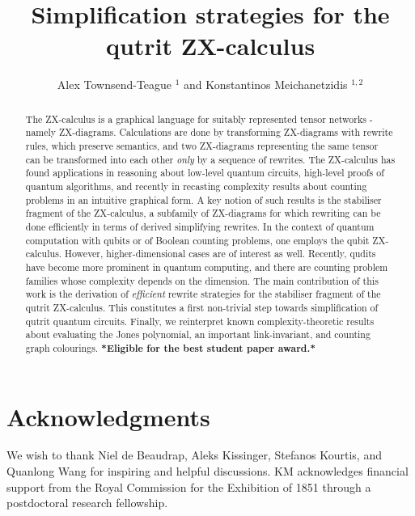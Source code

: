 \documentclass[runningheads]{llncs}
\title{Simplification strategies for the qutrit ZX-calculus}
\author{Alex Townsend-Teague $^{1}$ and Konstantinos Meichanetzidis $^{1,2}$
	\institute{$^1$ University of Oxford \\ $^2$ Cambridge Quantum Computing Ltd.}
}
\begin{document}
\maketitle
\begin{abstract}
	The ZX-calculus is a graphical language for suitably represented tensor networks - namely ZX-diagrams.
	Calculations are done by transforming ZX-diagrams with rewrite rules, which preserve semantics, and two ZX-diagrams representing the same tensor can be transformed into each other \emph{only} by a sequence of rewrites.
	The ZX-calculus has found applications in reasoning about low-level quantum circuits, high-level proofs of quantum algorithms, and recently in recasting complexity results about counting problems in an intuitive graphical form.
	A key notion of such results is the stabiliser fragment of the ZX-calculus, a subfamily of ZX-diagrams for which rewriting can be done efficiently in terms of derived simplifying rewrites.
	In the context of quantum computation with qubits or of Boolean counting problems, one employs the qubit ZX-calculus.
	However, higher-dimensional cases are of interest as well. Recently, qudits have become more prominent in quantum computing, and there are counting problem families whose complexity depends on the dimension.
	The main contribution of this work is the derivation of
	\emph{efficient} rewrite strategies for the stabiliser fragment of the qutrit ZX-calculus.
	This constitutes a first non-trivial step towards simplification of qutrit quantum circuits. Finally, we reinterpret known complexity-theoretic results about evaluating the Jones polynomial, an important link-invariant, and counting graph colourings. 
	\textbf{*Eligible for the best student paper award.*}
\end{abstract}







\section{Acknowledgments}
We wish to thank Niel de Beaudrap, Aleks Kissinger, Stefanos 
Kourtis, and Quanlong Wang for inspiring and helpful discussions.
KM acknowledges financial support from the Royal Commission for the Exhibition of 1851 through a postdoctoral research fellowship.

% 



\appendix

% 
% 
% 
% 
% 
% 
\end{document}
